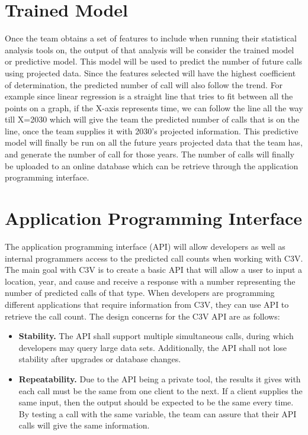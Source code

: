 \documentclass[onecolumn, draftclsnofoot,10pt, compsoc]{IEEEtran}
\begin{document}
\begin{singlespace}
\section{Trained Model} \label{trained_model}
   Once the team obtains a set of features to include when running their statistical analysis tools on, the output of that analysis will be consider the trained model or predictive model.
   This model will be used to predict the number of future calls using projected data.
   Since the features selected will have the highest coefficient of determination, the predicted number of call will also follow the trend.
   For example since linear regression is a straight line that tries to fit between all the points on a graph, if the X-axis represents time, we can follow the line all the way till X=2030 which will give the team the predicted number of calls that is on the line, once the team supplies it with 2030's projected information.
   This predictive model will finally be run on all the future years projected data that the team has, and generate the number of call for those years. The number of calls will finally be uploaded to an online database which can be retrieve through the application programming interface.
	
\section{Application Programming Interface} \label{api}
    The application programming interface (API) will allow developers as well as internal programmers access to the predicted call counts when working with C3V.
    The main goal with C3V is to create a basic API that will allow a user to input a location, year, and cause and receive a response with a number representing the number of predicted calls of that type.
    When developers are programming different applications that require information from C3V, they can use API to retrieve the call count.
    The design concerns for the C3V API are as follows:
    \begin{itemize}
        \item \textbf{Stability.} The API shall support multiple simultaneous calls, during which developers may query large data sets.
        Additionally, the API shall not lose stability after upgrades or database changes.
        \item \textbf{Repeatability. } Due to the API being a private tool, the results it gives with each call must be the same from one client to the next. If a client supplies the same input, then the output should be expected to be the same every time.
        By testing a call with the same variable, the team can assure that their API calls will give the same information.
    \end{itemize}

\end{singlespace}
\end{document}
